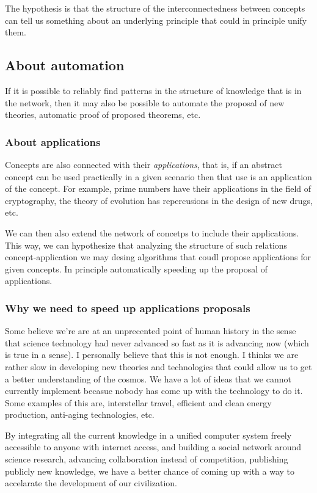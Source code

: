 \indent
The hypothesis is that the structure of the interconnectedness between
concepts can tell us something about an underlying principle that could
in principle unify them.


\subsection{About automation}
If it is possible to reliably find patterns in the structure
of knowledge that is in the network, then it may also be
possible to automate the proposal of new theories, automatic
proof of proposed theorems, etc.

\subsubsection{About applications}
\indent
Concepts are also connected with their \textit{applications},
that is, if an abstract concept can be used practically in 
a given scenario then that use is an application of the 
concept. For example, prime numbers have their applications
in the field of cryptography, the theory of evolution has 
repercusions in the design of new drugs, etc.

\indent
We can then also extend the network of concetps to include 
their applications. This way, we can hypothesize that 
analyzing the structure of such relations  concept-application
we may desing algorithms that coudl propose applications for 
given concepts. In principle automatically speeding up the 
proposal of applications.

\subsubsection{Why we need to speed up applications proposals}
\indent
Some believe we're are at an unprecented point of human history
in the sense that science technology had never advanced so fast as it 
is advancing now (which is true in a sense).
I personally believe that this is not enough. I thinks we 
are rather slow in developing new theories and technologies 
that could allow us to get a better understanding of the cosmos.
We have a lot of ideas that we cannot currently implement becasue
nobody has come up with the technology to do it. Some examples 
of this are, interstellar travel, efficient and clean energy 
production, anti-aging technologies, etc.


\indent
By integrating all the current knowledge in a unified computer 
system freely accessible to anyone with internet access, and 
building a social network around science research, advancing 
collaboration instead of competition, publishing publicly new
knowledge, we have a better chance of coming up with a way to 
accelarate the development of our civilization.



